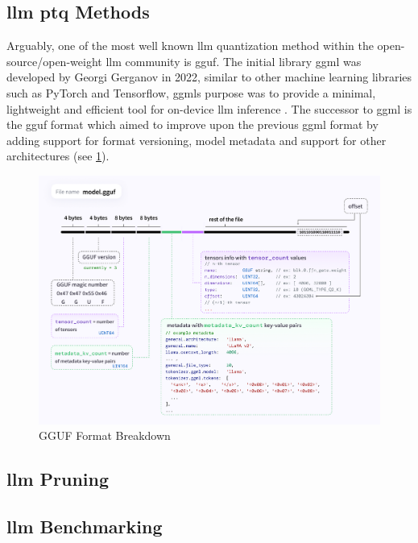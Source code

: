 \documentclass{ifacconf}
\begin{document}
	\subsection{\gls{llm} \gls{ptq} Methods}
	Arguably, one of the most well known \gls{llm} quantization method within the open-source/open-weight \gls{llm} community is \gls{gguf}. The initial library \gls{ggml} was developed by Georgi Gerganov in 2022, similar to other machine learning libraries such as PyTorch and Tensorflow, \glspl{ggml} purpose was to provide a minimal, lightweight and efficient tool for on-device \gls{llm} inference \cite{ggmlhuggingface}. The successor to \gls{ggml} is the \gls{gguf} format which aimed to improve upon the previous \gls{ggml} format by adding support for format versioning, model metadata and support for other architectures \cite{ggufgithub} (see \ref{fig:gguf}).
	
	\begin{figure}
		\begin{center}
			\includegraphics[width=\linewidth]{gguf}
			\caption{GGUF Format Breakdown}
			\label{fig:gguf}
		\end{center}
	\end{figure}
	
	
	\subsection{\gls{llm} Pruning}
	
	\subsection{\gls{llm} Benchmarking}
	
\end{document}
